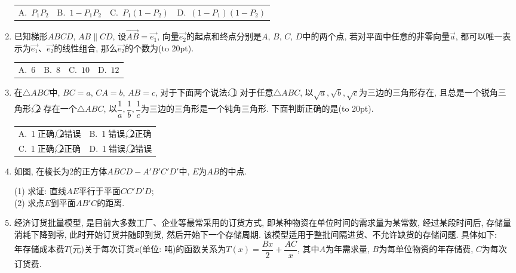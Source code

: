 \documentclass[10pt,a4paper]{article}
\newcommand{\bracket}[1]{(\hbox to #1pt{})}
\newcommand{\twoch}[4]{\par\begin{tabular}{p{.46\textwidth}p{.46\textwidth}}
A.~#1& B.~#2\\
C.~#3& D.~#4
\end{tabular}}
\newcommand{\fourch}[4]{\par\begin{tabular}{p{.23\textwidth}p{.23\textwidth}p{.23\textwidth}p{.23\textwidth}}
A.~#1 &B.~#2& C.~#3& D.~#4
\end{tabular}}
\begin{document}
\begin{enumerate}[1.]
\fourch{$P_1P_2$}{$1-P_1P_2$}{$P_1(1-P_2)$}{$(1-P_1)(1-P_2)$}
\item 已知梯形$ABCD$, $AB\parallel CD$, 设$\overrightarrow{AB}=\overrightarrow{e_1}$, 向量$\overrightarrow{e_2}$的起点和终点分别是$A$, $B$, $C$, $D$中的两个点, 若对平面中任意的非零向量$\overrightarrow a$, 都可以唯一表示为$\overrightarrow{e_1}$、$\overrightarrow{e_2}$的线性组合, 那么$\overrightarrow{e_2}$的个数为\bracket{20}.
\fourch{$6$}{$8$}{$10$}{$12$}
\item 在$\triangle ABC$中, $BC=a$, $CA=b$, $AB=c$, 对于下面两个说法:
\textcircled{1} 对于任意$\triangle ABC$, 以$\sqrt a,\sqrt b,\sqrt c$为三边的三角形存在, 且总是一个锐角三角形;
\textcircled{2} 存在一个$\triangle ABC$, 以$\dfrac 1a,\dfrac 1b,\dfrac 1c$为三边的三角形是一个钝角三角形.
下面判断正确的是\bracket{20}.
\twoch{\textcircled{1}正确, \textcircled{2}错误}{\textcircled{1}错误, \textcircled{2}正确}{\textcircled{1}正确, \textcircled{2}正确}{\textcircled{1}错误, \textcircled{2}错误}
\item  如图, 在棱长为$2$的正方体$ABCD-A'B'C'D'$中, $E$为$AB$的中点.
\begin{center}
\end{center}
(1) 求证: 直线$AE$平行于平面$CC'D'D$;\\
(2) 求点$E$到平面$AB'C$的距离.
\item 经济订货批量模型, 是目前大多数工厂、企业等最常采用的订货方式, 即某种物资在单位时间的需求量为某常数, 经过某段时间后, 存储量消耗下降到零, 此时开始订货并随即到货, 然后开始下一个存储周期. 该模型适用于整批间隔进货、不允许缺货的存储问题. 具体如下:\\
年存储成本费$T$(元)关于每次订货$x$(单位: 吨)的函数关系为$T(x)=\dfrac{Bx}2+\dfrac{AC}x$, 其中$A$为年需求量, $B$为每单位物资的年存储费, $C$为每次订货费.\\

\end{enumerate}
\end{document}
